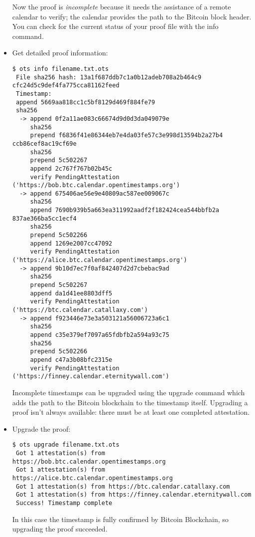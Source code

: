 \begin{itemize}
\bigskip
\noindent
Now the proof is \textit{incomplete} because it needs the assistance of a remote calendar to verify; the calendar provides the path to the Bitcoin block header. You can check for the current status of your proof file with the \colorbox{Grey!10}{info} command.
\item Get detailed proof information:\bigskip
\begin{lstlisting}[breakatwhitespace=true]
 $ ots info filename.txt.ots 
 File sha256 hash: 13a1f687ddb7c1a0b12adeb708a2b464c9 cfc24d5c9def4fa775cca81162feed
 Timestamp:
 append 5669aa818cc1c5bf8129d469f884fe79
 sha256
  -> append 0f2a11ae083c66674d9d0d3da049079e
     sha256
     prepend f6836f41e86344eb7e4da03fe57c3e998d13594b2a27b4 ccb86cef8ac19cf69e
     sha256
     prepend 5c502267
     append 2c767f767b02b45c
     verify PendingAttestation ('https://bob.btc.calendar.opentimestamps.org')
  -> append 675406ae56e9e40809ac587ee009067c
     sha256
     append 7690b939b5a663ea311992aadf2f182424cea544bbfb2a 837ae366ba5cc1ecf4
     sha256
     prepend 5c502266
     append 1269e2007cc47092
     verify PendingAttestation ('https://alice.btc.calendar.opentimestamps.org')
  -> append 9b10d7ec7f0af842407d2d7cbebac9ad
     sha256
     prepend 5c502267
     append da1d41ee8803dff5
     verify PendingAttestation ('https://btc.calendar.catallaxy.com')
  -> append f923446e73e3a503121a56006723a6c1
     sha256
     append c35e379ef7097a65fdbfb2a594a93c75
     sha256
     prepend 5c502266
     append c47a3b08bfc2315e
     verify PendingAttestation ('https://finney.calendar.eternitywall.com')
\end{lstlisting}
Incomplete timestamps can be upgraded using the \colorbox{Grey!10}{upgrade} command which adds the path to the Bitcoin blockchain to the timestamp itself. Upgrading a proof isn't always available: there must be at least one completed attestation.
\item Upgrade the proof: \bigskip
\begin{lstlisting}[breakatwhitespace=true]
 $ ots upgrade filename.txt.ots 
 Got 1 attestation(s) from https://bob.btc.calendar.opentimestamps.org
 Got 1 attestation(s) from https://alice.btc.calendar.opentimestamps.org
 Got 1 attestation(s) from https://btc.calendar.catallaxy.com
 Got 1 attestation(s) from https://finney.calendar.eternitywall.com
 Success! Timestamp complete
\end{lstlisting}
In this case the timestamp is fully confirmed by Bitcoin Blockchain, so upgrading the proof succeeded.


\end{itemize}
